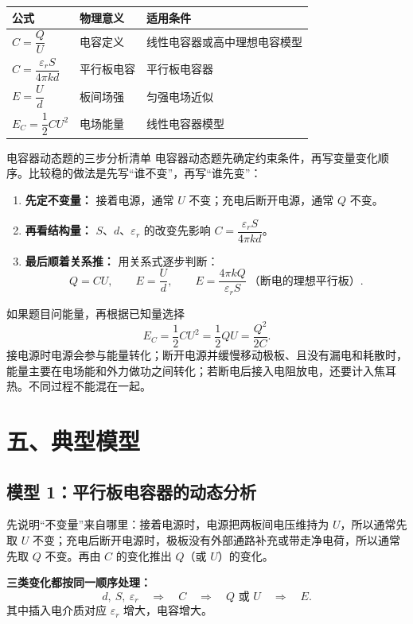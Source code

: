 \begin{center}
\begin{tabular}{lll}
\toprule
公式 & 物理意义 & 适用条件 \\
\midrule
$C = \dfrac{Q}{U}$ & 电容定义 & 线性电容器或高中理想电容模型 \\
$C = \dfrac{\varepsilon_r S}{4\pi k d}$ & 平行板电容 & 平行板电容器 \\
$E = \dfrac{U}{d}$ & 板间场强 & 匀强电场近似 \\
$E_C = \dfrac12 CU^2$ & 电场能量 & 线性电容器模型 \\
\bottomrule
\end{tabular}
\end{center}

\begin{learningbox}{电容器动态题的三步分析清单}
电容器动态题先确定约束条件，再写变量变化顺序。比较稳的做法是先写“谁不变”，再写“谁先变”：
\begin{enumerate}
  \item \textbf{先定不变量：} 接着电源，通常 $U$ 不变；充电后断开电源，通常 $Q$ 不变。
  \item \textbf{再看结构量：} $S$、$d$、$\varepsilon_r$ 的改变先影响 $C=\dfrac{\varepsilon_r S}{4\pi kd}$。
  \item \textbf{最后顺着关系推：} 用关系式逐步判断：
  \[
  Q=CU,\qquad E=\frac{U}{d},\qquad
  E=\frac{4\pi kQ}{\varepsilon_r S}\ \text{（断电的理想平行板）}.
  \]
\end{enumerate}
如果题目问能量，再根据已知量选择
\[
E_C=\frac12 CU^2=\frac12 QU=\frac{Q^2}{2C}.
\]
接电源时电源会参与能量转化；断开电源并缓慢移动极板、且没有漏电和耗散时，能量主要在电场能和外力做功之间转化；若断电后接入电阻放电，还要计入焦耳热。不同过程不能混在一起。
\end{learningbox}

\section*{五、典型模型}

\subsection*{模型 1：平行板电容器的动态分析}

先说明“不变量”来自哪里：接着电源时，电源把两板间电压维持为 $U$，所以通常先取 $U$ 不变；充电后断开电源时，极板没有外部通路补充或带走净电荷，所以通常先取 $Q$ 不变。再由 $C$ 的变化推出 $Q$（或 $U$）的变化。

\textbf{三类变化都按同一顺序处理：}
\[
d,\ S,\ \varepsilon_r \quad\Longrightarrow\quad C
\quad\Longrightarrow\quad Q\text{ 或 }U
\quad\Longrightarrow\quad E .
\]
其中插入电介质对应 $\varepsilon_r$ 增大，电容增大。

